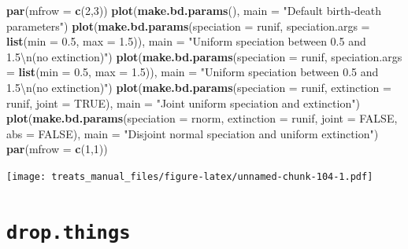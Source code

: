 \documentclass[
]{book}
\newenvironment{Shaded}{\begin{snugshade}}{\end{snugshade}}
\newcommand{\CharTok}[1]{\textcolor[rgb]{0.31,0.60,0.02}{#1}}
\newcommand{\DataTypeTok}[1]{\textcolor[rgb]{0.13,0.29,0.53}{#1}}
\newcommand{\DecValTok}[1]{\textcolor[rgb]{0.00,0.00,0.81}{#1}}
\newcommand{\FloatTok}[1]{\textcolor[rgb]{0.00,0.00,0.81}{#1}}
\newcommand{\KeywordTok}[1]{\textcolor[rgb]{0.13,0.29,0.53}{\textbf{#1}}}
\newcommand{\NormalTok}[1]{#1}
\newcommand{\OtherTok}[1]{\textcolor[rgb]{0.56,0.35,0.01}{#1}}
\newcommand{\StringTok}[1]{\textcolor[rgb]{0.31,0.60,0.02}{#1}}
\begin{document}
\begin{Shaded}
\begin{Highlighting}[]
\KeywordTok{par}\NormalTok{(}\DataTypeTok{mfrow =} \KeywordTok{c}\NormalTok{(}\DecValTok{2}\NormalTok{,}\DecValTok{3}\NormalTok{))}
\KeywordTok{plot}\NormalTok{(}\KeywordTok{make.bd.params}\NormalTok{(), }\DataTypeTok{main =} \StringTok{"Default birth{-}death parameters"}\NormalTok{)}
\KeywordTok{plot}\NormalTok{(}\KeywordTok{make.bd.params}\NormalTok{(}\DataTypeTok{speciation =}\NormalTok{ runif,}
               \DataTypeTok{speciation.args =} \KeywordTok{list}\NormalTok{(}\DataTypeTok{min =} \FloatTok{0.5}\NormalTok{, }\DataTypeTok{max =} \FloatTok{1.5}\NormalTok{)),}
     \DataTypeTok{main =} \StringTok{"Uniform speciation between 0.5 and 1.5}\CharTok{\textbackslash{}n}\StringTok{(no extinction)"}\NormalTok{)}
\KeywordTok{plot}\NormalTok{(}\KeywordTok{make.bd.params}\NormalTok{(}\DataTypeTok{speciation =}\NormalTok{ runif,}
                    \DataTypeTok{speciation.args =} \KeywordTok{list}\NormalTok{(}\DataTypeTok{min =} \FloatTok{0.5}\NormalTok{, }\DataTypeTok{max =} \FloatTok{1.5}\NormalTok{)),}
     \DataTypeTok{main =} \StringTok{"Uniform speciation between 0.5 and 1.5}\CharTok{\textbackslash{}n}\StringTok{(no extinction)"}\NormalTok{)}
\KeywordTok{plot}\NormalTok{(}\KeywordTok{make.bd.params}\NormalTok{(}\DataTypeTok{speciation =}\NormalTok{ runif, }\DataTypeTok{extinction =}\NormalTok{ runif, }\DataTypeTok{joint =} \OtherTok{TRUE}\NormalTok{),}
     \DataTypeTok{main =} \StringTok{"Joint uniform speciation and extinction"}\NormalTok{)}
\KeywordTok{plot}\NormalTok{(}\KeywordTok{make.bd.params}\NormalTok{(}\DataTypeTok{speciation =}\NormalTok{ rnorm, }\DataTypeTok{extinction =}\NormalTok{ runif,}
                    \DataTypeTok{joint =} \OtherTok{FALSE}\NormalTok{, }\DataTypeTok{abs =} \OtherTok{FALSE}\NormalTok{),}
     \DataTypeTok{main =} \StringTok{"Disjoint normal speciation and uniform extinction"}\NormalTok{)}
\KeywordTok{par}\NormalTok{(}\DataTypeTok{mfrow =} \KeywordTok{c}\NormalTok{(}\DecValTok{1}\NormalTok{,}\DecValTok{1}\NormalTok{))}
\end{Highlighting}
\end{Shaded}

\texttt{[image: treats\_manual\_files/figure-latex/unnamed-chunk-104-1.pdf]}

\hypertarget{dropthings}{%
\section{\texorpdfstring{\texttt{drop.things}}{drop.things}}\label{dropthings}}
\end{document}
